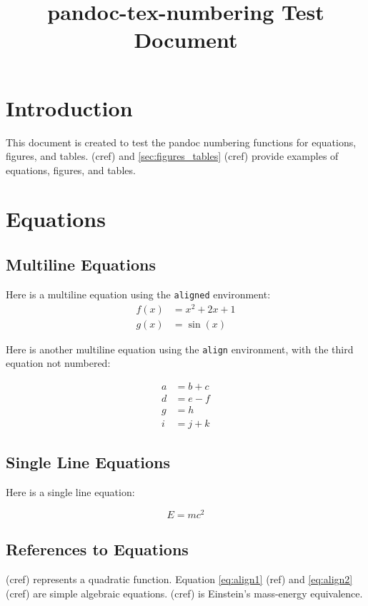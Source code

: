 \documentclass{article}
\title{pandoc-tex-numbering Test Document}
\begin{document}
\maketitle

\section{Introduction}
This document is created to test the pandoc numbering functions for equations, figures, and tables.  (cref) and \cref{sec:figures_tables} (cref) provide examples of equations, figures, and tables.

\section{Equations}

\subsection{Multiline Equations\label{sec:equations}}
Here is a multiline equation using the \texttt{aligned} environment:
\begin{equation}
    \begin{aligned}
        f(x) &= x^2 + 2x + 1 \\
        g(x) &= \sin(x)
    \end{aligned}
    \label{eq:quadratic}
\end{equation}

Here is another multiline equation using the \texttt{align} environment, with the third equation not numbered:

\begin{align}
    a &= b + c \label{eq:align1} \\
    d &= e - f \label{eq:align2} \\
    g &= h \nonumber \\
    i &= j + k \label{eq:align3}
\end{align}

\subsection{Single Line Equations}
Here is a single line equation:

\begin{equation}
    E = mc^2 \label{eq:einstein}
\end{equation}

\subsection{References to Equations}
 (cref) represents a quadratic function. Equation \ref{eq:align1} (ref) and \cref{eq:align2} (cref) are simple algebraic equations.  (cref) is Einstein's mass-energy equivalence. 
\end{document}
